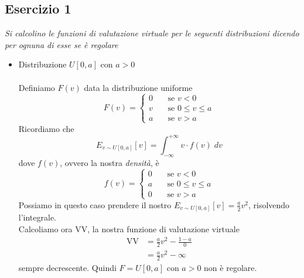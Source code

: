 \documentclass{article}
\begin{document}
        \subsection{Esercizio 1}
            \textit{Si calcolino le funzioni di valutazione virtuale per le seguenti distribuzioni dicendo per ognuna di esse se è regolare}\\
            \begin{itemize}
                \item Distribuzione $ U[0,a] $ con $ a > 0 $\\
                      \\
                      Definiamo $ F(v) $ data la distribuzione uniforme
                      \[
                          F(v) = \begin{cases}
                              0\quad &\text{se } v < 0 \\
                              v\quad &\text{se } 0 \leq v \leq a \\
                              a\quad &\text{se } v > a
                          \end{cases}    
                      \]
                      Ricordiamo che 
                      \[ 
                        E_{v \sim U[0,a]}[v] = \int_{-\infty}^{+\infty} v \cdot f(v)\; dv
                      \]
                      dove $ f(v) $, ovvero la nostra \textit{densità}, è
                      \[
                        f(v) = \begin{cases}
                            0\quad &\text{se } v < 0 \\
                            a\quad &\text{se } 0 \leq v \leq a \\
                            0\quad &\text{se } v > a
                        \end{cases}    
                      \]
                      Possiamo in questo caso prendere il nostro $ E_{v \sim U[0,a]}[v] = \frac{a}{2}v^2 $, risolvendo l'integrale.\\
                      Calcoliamo ora VV, la nostra funzione di valutazione virtuale
                      \[
                        \begin{aligned}
                            \text{VV} &= \frac{a}{2}v^2 - \frac{1 - a}{0} \\    
                            &= \frac{a}{2}v^2 - \infty
                        \end{aligned}
                      \]
                      sempre decrescente. Quindi $ F = U[0,a] \text{ con } a > 0 $ non è regolare.

\end{itemize}
\end{document}
